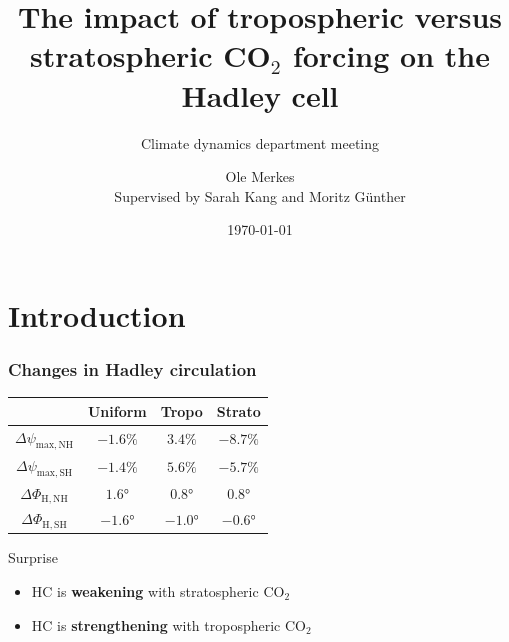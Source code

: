 \documentclass{beamer}
\subtitle{Climate dynamics department meeting}
\title{The impact of tropospheric versus stratospheric CO$_2$ forcing on the Hadley cell }
\author[Ole Merkes]{Ole Merkes \\[1\baselineskip]
Supervised by Sarah Kang and Moritz Günther \\
}
\date{\today}
\begin{document}
\begin{frame}
    \titlepage
\end{frame}
\section{Introduction}



\begin{frame}
  \frametitle{Changes in Hadley circulation}
\begin{table}[]
    \centering
    \begin{tabular}{c|ccc}
         &Uniform & Tropo & Strato \\ \toprule
        $\Delta\psi_\mathrm{max, NH}$& $-1.6\%$ & \textbf{$3.4\%$}& $-8.7\%$\\
        $\Delta\psi_\mathrm{max, SH}$ & $-1.4\%$ & $5.6\%$ & $-5.7\%$\\ 
        $\Delta\Phi_\mathrm{H, NH}$  & $1.6\unit{\degree}$& $0.8\unit{\degree}$ &$0.8\unit{\degree}$\\
        $\Delta\Phi_\mathrm{H, SH}$  & $-1.6\unit{\degree}$& $-1.0\unit{\degree}$ &$-0.6\unit{\degree}$\\
    \end{tabular}
    \label{tab:placeholder}
\end{table}
\begin{block}{Surprise}
    \begin{itemize}
        \item HC is \textbf{weakening} with stratospheric CO$_2$
        \item HC is \textbf{strengthening} with tropospheric CO$_2$
    \end{itemize}
\end{block}
\end{frame}


\end{document}
